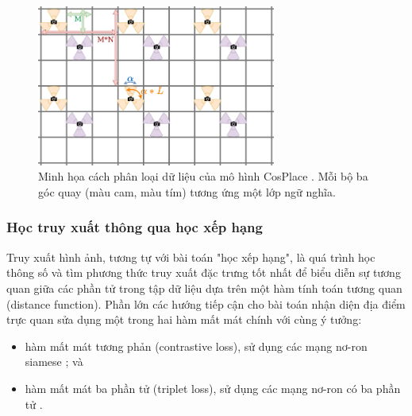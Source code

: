 \begin{figure}[H]
    \centering
    \includegraphics[width=0.7\textwidth]{pics/Chapter2/cosplaceclassify.png}
    \caption{Minh họa cách phân loại dữ liệu của mô hình CosPlace \cite{berton2022rethinking}. Mỗi bộ ba góc quay (màu cam, màu tím) tương ứng một lớp ngữ nghĩa.}
\end{figure}

\subsubsection{Học truy xuất thông qua học xếp hạng}

Truy xuất hình ảnh, tương tự với bài toán "học xếp hạng", là quá trình học thông số và tìm phương thức truy xuất đặc trưng tốt nhất để biểu diễn sự tương quan giữa các phần tử trong tập dữ liệu dựa trên một hàm tính toán tương quan (distance function). Phần lớn các hướng tiếp cận cho bài toán nhận diện địa điểm trực quan sửa dụng một trong hai hàm mất mát chính với cùng ý tưởng:

\begin{itemize}
    \item hàm mất mát tương phản (contrastive loss), sử dụng các mạng nơ-ron siamese \cite{ong2017siamese, GeM, randenovic2016BoW}; và
    \item hàm mất mát ba phần tử (triplet loss), sử dụng các mạng nơ-ron có ba phần tử \cite{arandjelovic2016netvlad, gordo2016deep, gordo2017endtoend, wang2014learning, jin2017learned, zheng2018sift}.
\end{itemize}

